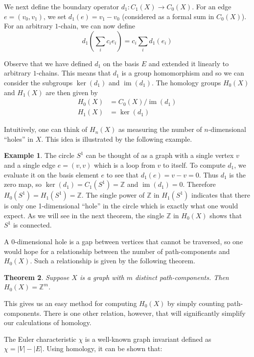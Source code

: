 \documentclass[12pt,a4paper]{amsart}
\numberwithin{equation}{section}
\def\Z{{\mathbb Z}}
\def\im{\operatorname{im}}
\def\ker{\operatorname{ker}}
\theoremstyle{plain}
\newtheorem{Th}{Theorem}[section]
\theoremstyle{definition}
\newtheorem{Ex}[Th]{Example}
\begin{document}
We next define the boundary operator $d_1 : C_1(X) \to C_0(X)$. For an edge $e=(v_0,v_1)$, we set $d_1(e) = v_1-v_0$ (considered as a formal sum in $C_0(X)$). For an arbitrary $1$-chain, we can now define
\[ d_1\left( \sum_i c_i e_i \right) = c_i \sum_i d_1(e_i) \]

Observe that we have defined $d_1$ on the basis $E$ and extended it linearly to arbitrary $1$-chains. This means that $d_1$ is a group homomorphism and so we can consider the subgroups $\ker(d_1)$ and $\im(d_1)$. The homology groups $H_0(X)$ and $H_1(X)$ are then given by
\begin{align*}
H_0(X) &= C_0(X) / \im(d_1) \\
H_1(X) &= \ker(d_1)
\end{align*}

Intuitively, one can think of $H_n(X)$ as measuring the number of $n$-dimensional ``holes'' in $X$. This idea is illustrated by the following example.

\begin{Ex} 
The circle $S^1$ can be thought of as a graph with a single vertex $v$ and a single edge $e = (v,v)$ which is a loop from $v$ to itself. To compute $d_1$, we evaluate it on the basis element $e$ to see that $d_1(e) = v-v = 0$. Thus $d_1$ is the zero map, so $\ker(d_1) = C_1(S^1) = \Z$ and $\im(d_1) = 0$. Therefore $H_0(S^1) = H_1(S^1) = \Z$. The single power of $\Z$ in $H_1(S^1)$ indicates that there is only one 1-dimensional ``hole'' in the circle which is exactly what one would expect. As we will see in the next theorem, the single $\Z$ in $H_0(X)$ shows that $S^1$ is connected.
\end{Ex}

A 0-dimensional hole is a gap between vertices that cannot be traversed, so one would hope for a relationship between the number of path-components and $H_0(X)$. Such a relationship is given by the following theorem.

\begin{Th}
Suppose $X$ is a graph with $m$ distinct path-components. Then $H_0(X) = \Z^m$.
\end{Th}

This gives us an easy method for computing $H_0(X)$ by simply counting path-components. There is one other relation, however, that will significantly simplify our calculations of homology.

The Euler characteristic $\chi$ is a well-known graph invariant defined as $\chi = |V| - |E|$. Using homology, it can be shown that:
\end{document}
